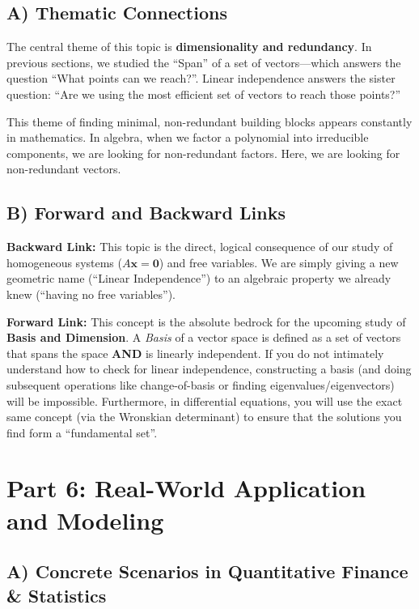 \documentclass[11pt]{article}
\begin{document}
\subsection{A) Thematic Connections}
The central theme of this topic is \textbf{dimensionality and redundancy}. In previous sections, we studied the ``Span'' of a set of vectors---which answers the question ``What points can we reach?''. Linear independence answers the sister question: ``Are we using the most efficient set of vectors to reach those points?'' 

This theme of finding minimal, non-redundant building blocks appears constantly in mathematics. In algebra, when we factor a polynomial into irreducible components, we are looking for non-redundant factors. Here, we are looking for non-redundant vectors.

\subsection{B) Forward and Backward Links}
\textbf{Backward Link:} This topic is the direct, logical consequence of our study of homogeneous systems ($A\mathbf{x} = \mathbf{0}$) and free variables. We are simply giving a new geometric name (``Linear Independence'') to an algebraic property we already knew (``having no free variables'').

\textbf{Forward Link:} This concept is the absolute bedrock for the upcoming study of \textbf{Basis and Dimension}. A \textit{Basis} of a vector space is defined as a set of vectors that spans the space \textbf{AND} is linearly independent. If you do not intimately understand how to check for linear independence, constructing a basis (and doing subsequent operations like change-of-basis or finding eigenvalues/eigenvectors) will be impossible. Furthermore, in differential equations, you will use the exact same concept (via the Wronskian determinant) to ensure that the solutions you find form a ``fundamental set''.

\newpage

\section{Part 6: Real-World Application and Modeling}

\subsection{A) Concrete Scenarios in Quantitative Finance \& Statistics}
\end{document}
